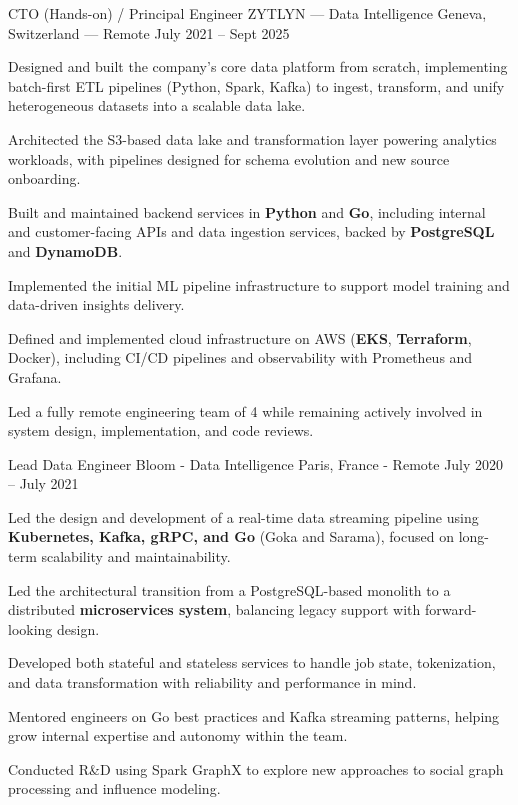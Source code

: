 \begin{cventries}
\cventry
  {CTO (Hands-on) / Principal Engineer}
  {ZYTLYN — Data Intelligence}
  {Geneva, Switzerland — Remote}
  {July 2021 -- Sept 2025}
  {
    \begin{cvitems}
      \item {Designed and built the company’s core data platform from scratch, implementing batch-first ETL pipelines (Python, Spark, Kafka) to ingest, transform, and unify heterogeneous datasets into a scalable data lake.}
      \item {Architected the S3-based data lake and transformation layer powering analytics workloads, with pipelines designed for schema evolution and new source onboarding.}
      \item {Built and maintained backend services in \textbf{Python} and \textbf{Go}, including internal and customer-facing APIs and data ingestion services, backed by \textbf{PostgreSQL} and \textbf{DynamoDB}.}
      \item {Implemented the initial ML pipeline infrastructure to support model training and data-driven insights delivery.}
      \item {Defined and implemented cloud infrastructure on AWS (\textbf{EKS}, \textbf{Terraform}, Docker), including CI/CD pipelines and observability with Prometheus and Grafana.}
      \item {Led a fully remote engineering team of 4 while remaining actively involved in system design, implementation, and code reviews.}
    \end{cvitems}
  }
\cventry
  {Lead Data Engineer} %
  {Bloom - Data Intelligence} %
  {Paris, France - Remote} %
  {July 2020 – July 2021} %
  {
    \begin{cvitems} %
      \item {Led the design and development of a real-time data streaming pipeline using \textbf{Kubernetes, Kafka, gRPC, and Go} (Goka and Sarama), focused on long-term scalability and maintainability.}
      \item {Led the architectural transition from a PostgreSQL-based monolith to a distributed \textbf{microservices system}, balancing legacy support with forward-looking design.}
      \item {Developed both stateful and stateless services to handle job state, tokenization, and data transformation with reliability and performance in mind.}
      \item {Mentored engineers on Go best practices and Kafka streaming patterns, helping grow internal expertise and autonomy within the team.}
      \item {Conducted R\&D using Spark GraphX to explore new approaches to social graph processing and influence modeling.}
    \end{cvitems}
  }


\end{cventries}
